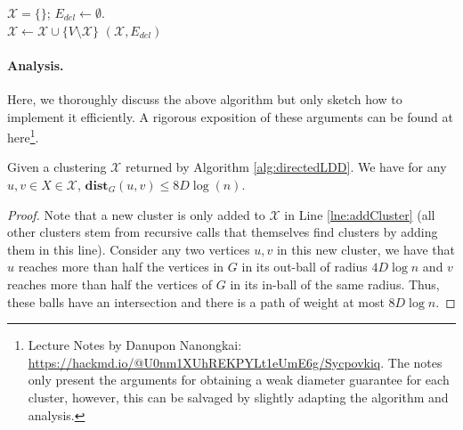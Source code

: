 \begin{algorithm}
$\mathcal{X} = \{\}$;  $E_{del} \gets \emptyset$.\\
$\mathcal{X} \gets \mathcal{X} \cup \{ V \setminus \mathcal{X}\}$\label{lne:addCluster} 
\Return $(\mathcal{X}, E_{del})$
\caption{$\textsc{ComputeDirectedLDD}(G, D)$}
\label{alg:directedLDD}
\end{algorithm}

\paragraph{Analysis.} Here, we thoroughly discuss the above algorithm but only sketch how to implement it efficiently. A rigorous exposition of these arguments can be found at here\footnote{Lecture Notes by Danupon Nanongkai: \url{https://hackmd.io/@U0nm1XUhREKPYLt1eUmE6g/Sycpovkiq}. The notes only present the arguments for obtaining a weak diameter guarantee for each cluster, however, this can be salvaged by slightly adapting the algorithm and analysis.}.

\begin{claim}\label{clm:smallDiamLDD}
Given a clustering $\mathcal{X}$ returned by Algorithm \ref{alg:directedLDD}. We have for any $u,v \in X \in \mathcal{X}$, $\mathbf{dist}_{G}(u,v) \leq 8 D \log(n)$. 
\end{claim}
\begin{proof}
Note that a new cluster is only added to $\mathcal{X}$ in Line \ref{lne:addCluster} (all other clusters stem from recursive calls that themselves find clusters by adding them in this line). Consider any two vertices $u,v$ in this new cluster, we have that $u$ reaches more than half the vertices in $G$ in its out-ball of radius $4D \log n$ and $v$ reaches more than half the vertices of $G$ in its in-ball of the same radius. Thus, these balls have an intersection and there is a path of weight at most $8D \log n$. 
\end{proof}

